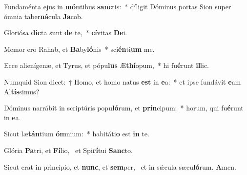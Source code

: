 \item Fundaménta ejus in \textbf{món}tibus \textbf{sanc}tis:~* díligit Dóminus portas Sion super ómnia taber\textbf{ná}cula \textbf{Ja}cob.
\item Gloriósa \textbf{dic}ta sunt \textbf{de} te,~* \textbf{cí}vitas \textbf{De}i.
\item Memor ero Rahab, et \textbf{Ba}by\textbf{ló}nis~* sci\textbf{én}ti\textbf{um} me.
\item Ecce alienígenæ, et Tyrus, et pópu\textbf{lus} Æ\textbf{thí}opum,~* hi fu\textbf{é}runt \textbf{il}lic.
\item Numquid Sion dicet:~† Homo, et homo natus \textbf{est} in \textbf{e}a:~* et ipse fundávit \textbf{e}am Al\textbf{tís}simus?
\item Dóminus narrábit in scriptúris popu\textbf{ló}rum, et \textbf{prín}cipum:~* horum, qui fu\textbf{é}runt in \textbf{e}a.
\item Sicut læ\textbf{tán}tium \textbf{óm}nium:~* habitáti\textbf{o} est \textbf{in} te.
\item Glória \textbf{Pa}tri, et \textbf{Fí}lio,~\psstar{} et Spi\textbf{rí}tui \textbf{Sanc}to.
\item Sicut erat in princípio, et \textbf{nunc}, et \textbf{sem}per,~\psstar{} et in sǽcula sæcu\textbf{ló}rum. \textbf{A}men.
